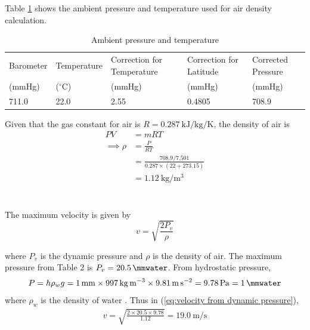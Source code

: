 \section{}
Table \ref{tab:ambient_pressure_and_temperature} shows the ambient pressure and temperature used for air density calculation.

\begin{table}[h]
    \centering
    \caption{Ambient pressure and temperature}
    \label{tab:ambient_pressure_and_temperature}
    \begin{tabular}{p{2cm}p{2cm}p{2cm}p{2cm}p{2cm}}
        \toprule
        Barometer & Temperature & Correction for Temperature & Correction for Latitude & Corrected Pressure \\
        (mmHg) & ($^\circ$C) & (mmHg) & (mmHg) & (mmHg) \\
        \midrule
        711.0 & 22.0 & 2.55 & 0.4805 & 708.9 \\
        \bottomrule
    \end{tabular}
\end{table}

Given that the gas constant for air is $R = \qty{0.287}{\kilo\joule\per\kilogram\per\kelvin}$, the density of air is
\begin{align*}
    PV &= mRT \\
    \implies \rho &= \frac{P}{RT} \\
    &= \frac{708.9/7.501}{0.287 \times (22 + 273.15)} \\
    &= \boxed{\qty{1.12}{\kilogram\per\meter\cubed}}
\end{align*}

\section{}
The maximum velocity is given by
\begin{equation}
    v = \sqrt{\frac{2 P_v}{\rho}} \label{eq:velocity from dynamic pressure}
\end{equation}

where $P_v$ is the dynamic pressure and $\rho$ is the density of air. The maximum pressure from 
Table 2 is $P_v = \qty{20.5}{\mmwater}$. From hydrostatic pressure,
\begin{equation*}
    P = h \rho_w g = \qty{1}{\milli\meter} \times \qty{997}{\kilogram\per\meter\cubed} \times \qty{9.81}{\meter\per\second\squared} = \qty{9.78}{\pascal} = \qty{1}{\mmwater}
\end{equation*}
where $\rho_w$ is the density of water \cite{bigg_density_1967}. Thus in (\ref{eq:velocity from dynamic pressure}),
\begin{align*}
    v = \sqrt{\frac{2 \times 20.5 \times 9.78}{1.12}} = \boxed{\qty{19.0}{\meter\per\second}}
\end{align*}

